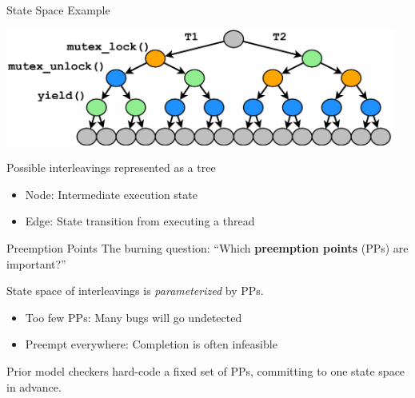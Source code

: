 \documentclass[xcolor=dvipsnames]{beamer}
\begin{document}
\begin{frame}{State Space Example}
	\begin{center}
		\includegraphics[width=0.96\textwidth]{tree-maximal-only.pdf}
	\end{center}
	\linegap

	Possible interleavings represented as a tree
	\begin{itemize}
		\item Node: Intermediate execution state
		\item Edge: State transition from executing a thread
	\end{itemize}
\end{frame}

\begin{frame}{Preemption Points}
	The burning question: ``Which {\bf preemption points} (PPs) are important?''
	\linegap

	State space of interleavings is {\em parameterized} by PPs.
	\begin{itemize}
		\item Too few PPs: Many bugs will go undetected
		\item Preempt everywhere: Completion is often infeasible %
	\end{itemize}
	\linegap

	Prior model checkers hard-code a fixed set of PPs, committing to one state space in advance.
\end{frame}
\end{document}
